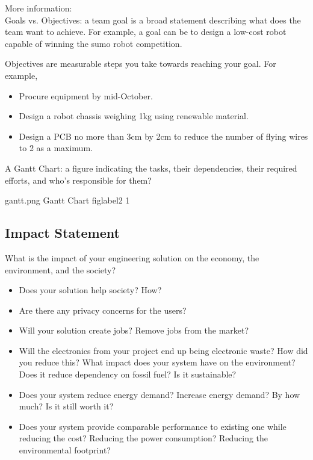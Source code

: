 More information: \\

Goals vs. Objectives: a team goal is a broad statement describing what does the team want to achieve. For example, a goal can be to design a low-cost robot capable of winning the sumo robot competition. 

Objectives are measurable steps you take towards reaching your goal. For example, 
\begin{itemize}
    


\item	Procure equipment by mid-October.
\item	Design a robot chassis weighing 1kg using renewable material. 
\item	Design a PCB no more than 3cm by 2cm to reduce the number of flying wires to 2 as a maximum. 
    
\end{itemize}

A Gantt Chart: a figure indicating the tasks, their dependencies, their required efforts, and who’s responsible for them?

\ecefigure
{gantt.png}
{Gantt Chart}
{figlabel2}
{1}  
 


\subsection{Impact Statement}
What is the impact of your engineering solution on the economy, the environment, and the society? 
\begin{itemize}
    \item 	Does your solution help society? How? 
 \item	Are there any privacy concerns for the users? 
 \item	Will your solution create jobs? Remove jobs from the market? 
 \item	Will the electronics from your project end up being electronic waste? How did you reduce this? What impact does your system have on the environment? Does it reduce dependency on fossil fuel? Is it sustainable? 
 \item	Does your system reduce energy demand? Increase energy demand? By how much? Is it still worth it? 
 \item	Does your system provide comparable performance to existing one while reducing the cost? Reducing the power consumption? Reducing the environmental footprint? 
\end{itemize}




